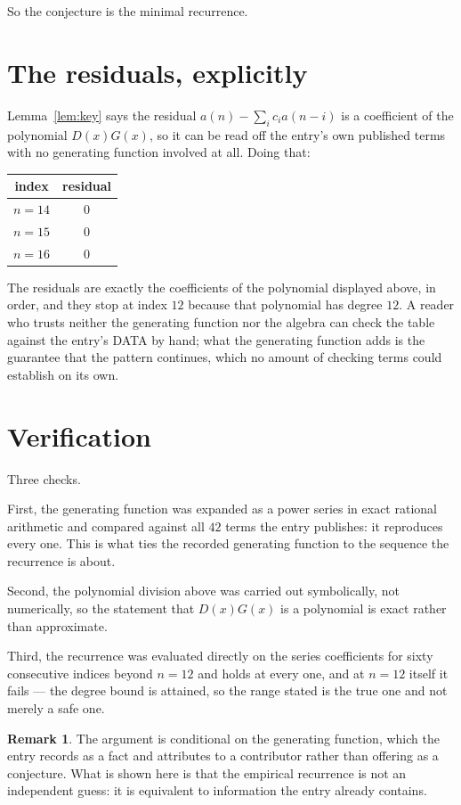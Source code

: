 \documentclass[11pt,a4paper]{article}
\theoremstyle{plain}
\theoremstyle{definition}
\newtheorem{remark}[theorem]{Remark}
\begin{document}
So the conjecture is the minimal recurrence.

\section{The residuals, explicitly}

Lemma~\ref{lem:key} says the residual $a(n)-\sum_ic_ia(n-i)$ is a coefficient of the
polynomial $D(x)G(x)$, so it can be read off the entry's own published terms with no
generating function involved at all. Doing that:
\begin{center}
\begin{tabular}{cc}
index & residual \\ \hline
$n=14$ & $0$ \\
$n=15$ & $0$ \\
$n=16$ & $0$
\end{tabular}
\end{center}
The residuals are exactly the coefficients of the polynomial displayed above, in order, and
they stop at index $12$ because that polynomial has degree $12$. A reader who trusts
neither the generating function nor the algebra can check the table against the entry's DATA
by hand; what the generating function adds is the guarantee that the pattern continues, which
no amount of checking terms could establish on its own.

\section{Verification}

Three checks.

First, the generating function was expanded as a power series in exact rational arithmetic and
compared against all $42$ terms the entry publishes: it reproduces every one. This is
what ties the recorded generating function to the sequence the recurrence is about.

Second, the polynomial division above was carried out symbolically, not numerically, so the
statement that $D(x)G(x)$ is a polynomial is exact rather than approximate.

Third, the recurrence was evaluated directly on the series coefficients for sixty consecutive
indices beyond $n=12$ and holds at every one, and at $n=12$ itself it fails --- the
degree bound is attained, so the range stated is the true one and not merely a safe one.

\begin{remark}
The argument is conditional on the generating function, which the entry records as a fact and
attributes to a contributor rather than offering as a conjecture. What is shown here is that
the empirical recurrence is not an independent guess: it is equivalent to information the
entry already contains.
\end{remark}
\end{document}

